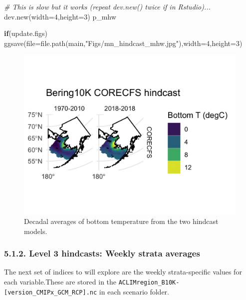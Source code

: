 \documentclass[
]{article}
\newenvironment{Shaded}{\begin{snugshade}}{\end{snugshade}}
\newcommand{\AttributeTok}[1]{\textcolor[rgb]{0.77,0.63,0.00}{#1}}
\newcommand{\CommentTok}[1]{\textcolor[rgb]{0.56,0.35,0.01}{\textit{#1}}}
\newcommand{\ControlFlowTok}[1]{\textcolor[rgb]{0.13,0.29,0.53}{\textbf{#1}}}
\newcommand{\DecValTok}[1]{\textcolor[rgb]{0.00,0.00,0.81}{#1}}
\newcommand{\FunctionTok}[1]{\textcolor[rgb]{0.00,0.00,0.00}{#1}}
\newcommand{\NormalTok}[1]{#1}
\newcommand{\StringTok}[1]{\textcolor[rgb]{0.31,0.60,0.02}{#1}}
\begin{document}
\begin{Shaded}
\begin{Highlighting}[]
    \CommentTok{\# This is slow but it works (repeat dev.new() twice if in Rstudio)...}
    \FunctionTok{dev.new}\NormalTok{(}\AttributeTok{width=}\DecValTok{4}\NormalTok{,}\AttributeTok{height=}\DecValTok{3}\NormalTok{)}
\NormalTok{    p\_mhw}
    
    \ControlFlowTok{if}\NormalTok{(update.figs)  }
      \FunctionTok{ggsave}\NormalTok{(}\AttributeTok{file=}\FunctionTok{file.path}\NormalTok{(main,}\StringTok{"Figs/mn\_hindcast\_mhw.jpg"}\NormalTok{),}\AttributeTok{width=}\DecValTok{4}\NormalTok{,}\AttributeTok{height=}\DecValTok{3}\NormalTok{)}
\end{Highlighting}
\end{Shaded}

\begin{figure}
\centering
\includegraphics[width=1\textwidth,height=\textheight]{Figs/mn_hindcast_mhw.jpg}
\caption{Decadal averages of bottom temperature from the two hindcast
models.}
\end{figure}

\hypertarget{level-3-hindcasts-weekly-strata-averages}{%
\subsubsection{5.1.2. Level 3 hindcasts: Weekly strata
averages}\label{level-3-hindcasts-weekly-strata-averages}}

The next set of indices to will explore are the weekly strata-specific
values for each variable.These are stored in the
\texttt{ACLIMregion\_B10K-{[}version\_CMIPx\_GCM\_RCP{]}.nc} in each
scenario folder.
\end{document}
